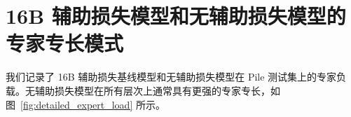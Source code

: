 \documentclass[lang=cn,a4paper,newtx]{elegantpaper}
\begin{document}
\section{16B 辅助损失模型和无辅助损失模型的专家专长模式}
\label{app:detailed_expert_load}

我们记录了 16B 辅助损失基线模型和无辅助损失模型在 Pile 测试集上的专家负载。无辅助损失模型在所有层次上通常具有更强的专家专长，如图~\ref{fig:detailed_expert_load} 所示。

\begin{figure}[!t]
\end{figure}
\end{document}
